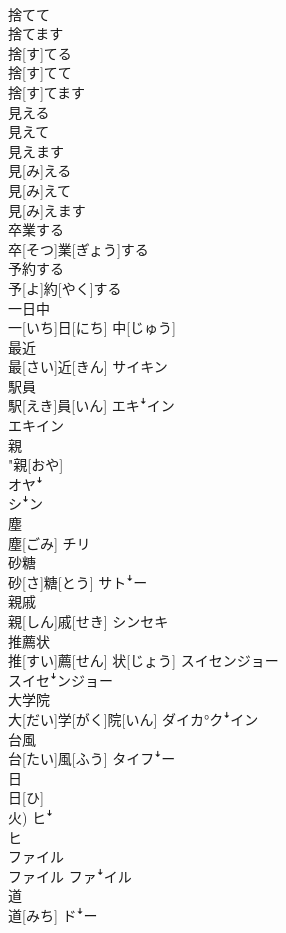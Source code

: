 \documentclass[8pt]{extreport}
\begin{document}
\begin{CJK}{UTF8}{min}
\\	捨てて 
\\	捨てます	
\\	捨[す]てる 
\\	捨[す]てて 
\\	捨[す]てます	
\\	見える 
\\	見えて 
\\	見えます	
\\	見[み]える 
\\	見[み]えて 
\\	見[み]えます	
\\	卒業する	
\\	卒[そつ]業[ぎょう]する	
\\	予約する	
\\	予[よ]約[やく]する	
\\	一日中	
\\	一[いち]日[にち] 中[じゅう]	
\\	最近	
\\	最[さい]近[きん]	サイキン
\\	駅員	
\\	駅[えき]員[いん]	エキꜜイン 
\\	エキイン
\\	親	
\\	"親[おや] 
\\	オヤꜜ 
\\	シꜜン
\\	塵	
\\	塵[ごみ]	チリ
\\	砂糖	
\\	砂[さ]糖[とう]	サトꜜー
\\	親戚	
\\	親[しん]戚[せき]	シンセキ
\\	推薦状	
\\	推[すい]薦[せん] 状[じょう]	スイセンジョー 
\\	スイセꜜンジョー
\\	大学院	
\\	大[だい]学[がく]院[いん]	ダイカ°クꜜイン
\\	台風	
\\	台[たい]風[ふう]	タイフꜜー
\\	日	
\\	日[ひ] 
\\	火)	ヒꜜ 
\\	ヒ
\\	ファイル	
\\	ファイル	ファꜜイル
\\	道	
\\	道[みち]	ドꜜー 

\end{CJK}
\end{document}
